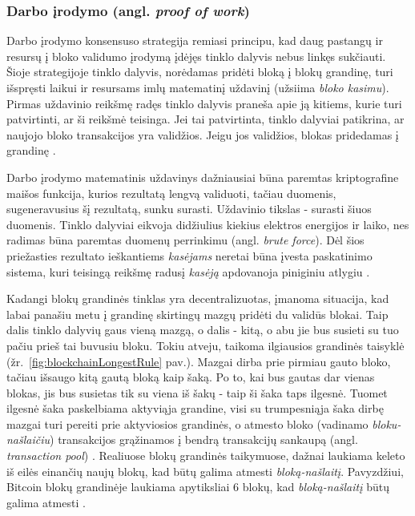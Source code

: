 \subsubsection{Darbo įrodymo (angl. \textit{proof of work})}

Darbo įrodymo konsensuso strategija remiasi principu, kad daug pastangų ir resursų į bloko validumo įrodymą įdėjęs tinklo
dalyvis nebus linkęs sukčiauti. Šioje strategijoje tinklo dalyvis, norėdamas pridėti bloką į blokų grandinę, turi išspręsti laikui ir resursams
imlų matematinį
uždavinį (užsiima \textit{bloko kasimu}). Pirmas uždavinio reikšmę radęs tinklo dalyvis praneša apie ją kitiems, kurie turi patvirtinti,
ar ši reikšmė teisinga. Jei tai patvirtinta, tinklo dalyviai patikrina, ar naujojo bloko transakcijos yra validžios. Jeigu jos validžios,
blokas pridedamas į grandinę \cite{Zheng2017}.

Darbo įrodymo matematinis uždavinys dažniausiai būna paremtas kriptografine maišos funkcija, kurios rezultatą lengvą validuoti,
tačiau duomenis, sugeneravusius šį rezultatą, sunku surasti. Uždavinio tikslas - surasti šiuos duomenis. Tinklo dalyviai eikvoja didžiulius
kiekius elektros energijos ir laiko,
nes radimas būna paremtas duomenų perrinkimu (angl. \textit{brute force}). Dėl šios priežasties rezultato ieškantiems \textit{kasėjams}
 neretai būna įvesta paskatinimo sistema, kuri teisingą reikšmę radusį
\textit{kasėją} apdovanoja piniginiu atlygiu \cite{SatoshiNakamoto}. 

Kadangi blokų grandinės tinklas yra decentralizuotas, įmanoma situacija, kad labai panašiu metu į grandinę skirtingų mazgų pridėti du validūs blokai.
Taip dalis tinklo dalyvių gaus vieną mazgą, o dalis - kitą, o abu jie bus susieti su tuo pačiu prieš tai buvusiu bloku.
Tokiu atveju, taikoma ilgiausios grandinės taisyklė (žr.~\ref{fig:blockchainLongestRule} pav.). Mazgai dirba prie pirmiau gauto bloko,
tačiau išsaugo kitą gautą bloką kaip šaką. Po to, kai bus gautas dar vienas blokas, jis bus susietas tik su viena iš šakų - taip ši šaka taps ilgesnė. Tuomet
ilgesnė šaka paskelbiama aktyviąja grandine, visi su trumpesniąja šaka dirbę mazgai turi pereiti prie aktyviosios grandinės, o atmesto bloko (vadinamo \textit{bloku-našlaičiu}) transakcijos
grąžinamos į bendrą transakcijų sankaupą (angl. \textit{transaction pool}) \cite{SatoshiNakamoto}.
Realiuose blokų grandinės taikymuose, dažnai laukiama keleto iš eilės einančių naujų blokų, kad būtų galima atmesti \textit{bloką-našlaitį}. Pavyzdžiui,
Bitcoin blokų grandinėje laukiama apytiksliai 6 blokų, kad \textit{bloką-našlaitį} būtų galima atmesti \cite{Zheng2017}.


